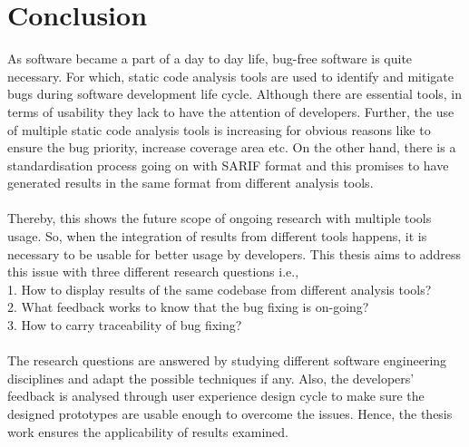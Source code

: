 \chapter{Conclusion}
\label{ch:conclusion}


As software became a part of a day to day life, bug-free software is quite necessary. For which, static code analysis tools are used to identify and mitigate bugs during software development life cycle. Although there are essential tools, in terms of usability they lack to have the attention of developers. Further, the use of multiple static code analysis tools is increasing for obvious reasons like to ensure the bug priority, increase coverage area etc. On the other hand, there is a standardisation process going on with SARIF format and this promises to have generated results in the same format from different analysis tools. \\ \\

Thereby, this shows the future scope of ongoing research with multiple tools usage. So, when the integration of results from different tools happens, it is necessary to be usable for better usage by developers. This thesis aims to address this issue with three different research questions i.e., \\ 1. How to display results of the same codebase from different analysis tools? \\
2. What feedback works to know that the bug fixing is on-going? \\
3. How to carry traceability of bug fixing? \\ \\

The research questions are answered by studying different software engineering disciplines and adapt the possible techniques if any. Also, the developers' feedback is analysed through user experience design cycle to make sure the designed prototypes are usable enough to overcome the issues. Hence, the thesis work ensures the applicability of results examined.